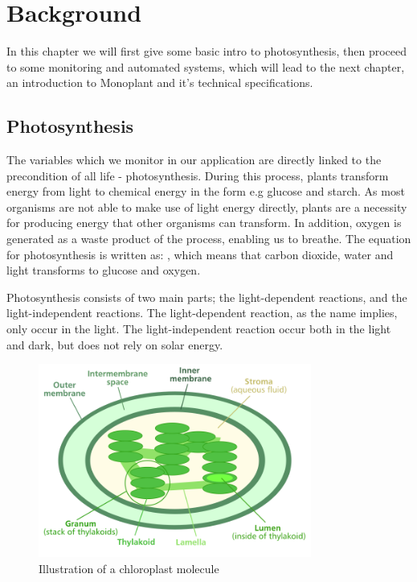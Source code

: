 \chapter{Background}
In this chapter we will first give some basic intro to photosynthesis, then proceed to some monitoring and automated systems, which will lead to the next chapter, an introduction to Monoplant and it's technical specifications.

\section{Photosynthesis}
The variables which we monitor in our application are directly linked to the precondition of all life - photosynthesis. During this process, plants  transform energy from light to chemical energy in the form e.g glucose and starch. As most organisms are not able to make use of light energy directly, plants are a necessity for producing energy that other organisms can transform. In addition, oxygen is generated as a waste product of the process, enabling us to breathe. The equation for photosynthesis is written as: , which means that carbon dioxide, water and light transforms to glucose and oxygen.  

Photosynthesis consists of two main parts; the light-dependent reactions, and the light-independent reactions. The light-dependent reaction, as the name implies, only occur in the light. The light-independent reaction occur both in the light and dark, but does not rely on solar energy.  

\begin{figure}
\centering
\includegraphics[width=0.8\textwidth]{img/photosynthesis/Chloroplast_diagram.png}
\caption{Illustration of a chloroplast molecule \citep{wiki:chloroplast}}
\label{fig:chloroplast}
\end{figure}

